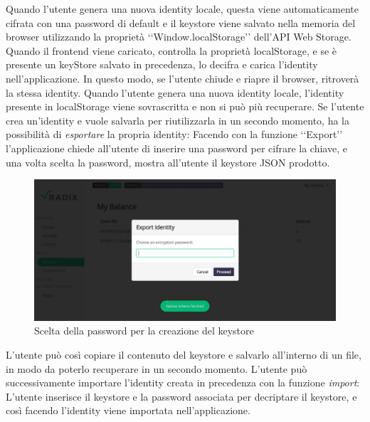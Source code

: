 Quando l'utente genera una nuova identity locale, questa viene automaticamente cifrata con una password di default e il keystore viene salvato nella memoria del browser utilizzando la proprietà ‘‘Window.localStorage’’ dell'API Web Storage. Quando il frontend viene caricato, controlla la proprietà localStorage, e se è presente un keyStore salvato in precedenza, lo decifra e carica l'identity nell'applicazione. In questo modo, se l'utente chiude e riapre il browser, ritroverà la stessa identity. Quando l'utente genera una nuova identity locale, l'identity presente in localStorage viene sovrascritta e non si può più recuperare. Se l'utente crea un'identity e vuole salvarla per riutilizzarla in un secondo momento, ha la possibilità di \textit{esportare} la propria identity: Facendo con la funzione ‘‘Export’’ l'applicazione chiede all'utente di inserire una password per cifrare la chiave, e una volta scelta la password, mostra all'utente il keystore JSON prodotto. 

\begin{figure}[H]
    \includegraphics[width=\linewidth]{images/application/choose-password.png}
    \caption{Scelta della password per la creazione del keystore}
    \label{fig:choose_password}
\end{figure}

L'utente può così copiare il contenuto del keystore e salvarlo all'interno di un file, in modo da poterlo recuperare in un secondo momento. L'utente può successivamente importare l'identity creata in precedenza con la funzione \textit{import}: L'utente inserisce il keystore e la password associata per decriptare il keystore, e così facendo l'identity viene importata nell'applicazione.

